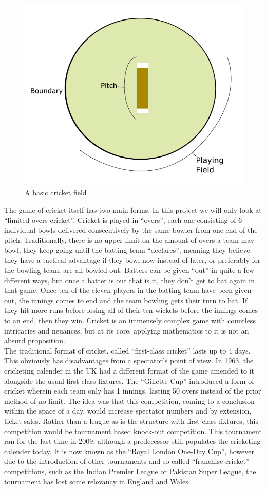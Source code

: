 \begin{figure}[h]
    \centering
    \includegraphics[width=0.7\linewidth]{figures/ptich.png}
    \caption{A basic cricket field}
    \label{pitch}
\end{figure}

The game of cricket itself has two main forms. In this project we will only look at ``limited-overs cricket''. Cricket is played in ``overs'', each one consisting of 6 individual bowls delivered consecutively by the same bowler from one end of the pitch.
 Traditionally, there is no upper limit on the amount of overs a team may bowl, they keep going until the batting team ``declares'', meaning they believe they have a tactical advantage if they bowl now instead of later, or preferably for the bowling team, are all bowled out. 
Batters can be given ``out'' in quite a few different ways, but once a batter is out that is it, they don't get to bat again in that game. Once ten of the eleven players in the batting team have been given out, the innings comes to end and the team bowling 
gets their turn to bat. If they hit more runs before losing all of their ten wickets before the innings comes to an end, then they win. Cricket is an immensely complex game with countless intricacies and neuances, but at 
its core, applying mathematics to it is not an absurd proposition. \\

The traditional format of cricket, called ``first-class cricket'' lasts up to 4 days. This obviously has disadvantages from a spectator's point of view. 
In 1963, the cricketing calender in the UK had a different format of the game amended to it alongside the usual first-class fixtures.
The ``Gillette Cup'' introduced a form of cricket wherein each team only has 1 innings, lasting 50 overs instead of the prior method of no limit. The idea was 
that this competition, coming to a conclusion within the space of a day, would increase spectator numbers and by extension, ticket sales.  Rather than a league 
as is the structure with first class fixtures, this competition would be tournament based knock-out competition. This tournament ran for the last time in 2009, although 
a predecessor still populates the cricketing calender today. It is now known as the ``Royal London One-Day Cup'', however due to the introduction of other tournaments 
and so-called ``franchise cricket'' competitions, such as the Indian Premier League or Pakistan Super League,  the tournament has lost some relevancy in England and Wales. \\

